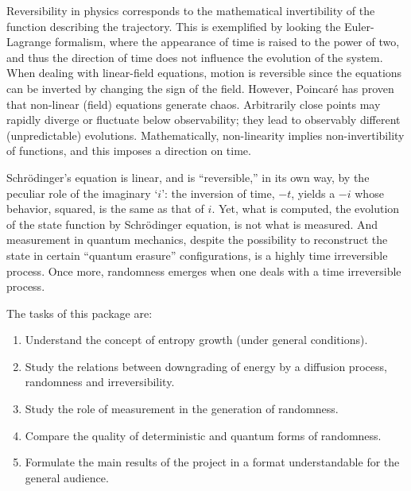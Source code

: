 \documentclass[12pt]{article}
\begin{document}
Reversibility in physics corresponds to the mathematical invertibility of the function describing the trajectory. This is exemplified by looking the Euler-Lagrange formalism, where the appearance of time is raised to the power of two, and thus the direction of time does not influence the evolution of the system. When dealing with linear-field equations, motion is reversible since the equations can be inverted by changing the sign of the field. However, Poincar\'e has proven  that non-linear (field) equations generate chaos. Arbitrarily close points may rapidly diverge or fluctuate below observability; they lead to observably different (unpredictable) evolutions. Mathematically, non-linearity implies non-invertibility of functions, and this imposes a direction on time.


Schr\"odinger's equation is linear, and is ``reversible,'' in
its own way, by the peculiar role of the imaginary `$i$':
the inversion of time,  $-t$, yields a $-i$ whose behavior,
squared, is the same as that of $i$. Yet, what is computed, the evolution of the state function by Schr\"odinger equation, is not what is measured.
And measurement in quantum mechanics, despite the possibility to reconstruct the state in certain
 ``quantum erasure'' configurations, is a highly time irreversible process.
Once more, randomness emerges when one deals with a time irreversible process.

The tasks of this package are:
\begin{enumerate}[label=Task
3.\arabic{enumi}:,leftmargin=3\parindent, labelindent=0pt, labelsep=*]
	\item Understand the concept of entropy growth (under general conditions).
	\item Study the relations between downgrading of energy by a diffusion process, randomness and irreversibility.
	\item Study the role of measurement in the generation of randomness.
	\item Compare the quality of deterministic and quantum forms of randomness.
\item Formulate the main results of the project in a format understandable for the general audience.
\end{enumerate}
\end{document}
